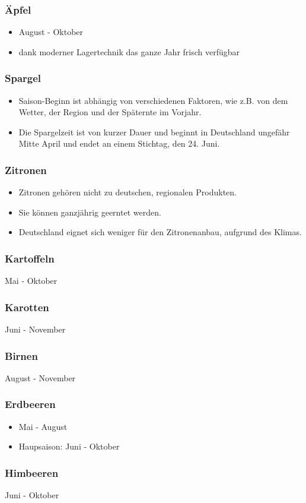 \documentclass{beamer}
\begin{document}
\begin{frame}
\frametitle{Äpfel}
  \begin{itemize}
    \item
August - Oktober
\item
dank moderner Lagertechnik das ganze Jahr frisch verfügbar
  \end{itemize}
\end{frame}
\begin{frame}
\frametitle{Spargel}
  \begin{itemize}
    \item
Saison-Beginn ist abhängig von verschiedenen Faktoren, wie z.B.
von dem Wetter, der Region und der Späternte im Vorjahr.
\item
Die Spargelzeit ist von kurzer Dauer und beginnt in Deutschland
ungefähr Mitte April und endet an einem Stichtag, den 24.
Juni.
  \end{itemize}
\end{frame}
\begin{frame}
\frametitle{Zitronen}
  \begin{itemize}
    \item
      Zitronen gehören nicht zu deutschen, regionalen
      Produkten.
    \item  Sie können ganzjährig geerntet werden.
    \item  Deutschland eignet sich weniger für den Zitronenanbau,
      aufgrund des Klimas.
  \end{itemize}
\end{frame}
\begin{frame}
\frametitle{Kartoffeln}
Mai - Oktober
\end{frame}
\begin{frame}
\frametitle{Karotten}
Juni - November
\end{frame}
\begin{frame}
\frametitle{Birnen}
August - November
\end{frame}
\begin{frame}
\frametitle{Erdbeeren}
  \begin{itemize}
    \item
Mai - August
\item Haupsaison: Juni - Oktober
  \end{itemize}
\end{frame}

\begin{frame}
\frametitle{Himbeeren}
Juni - Oktober
\end{frame}
\end{document}
